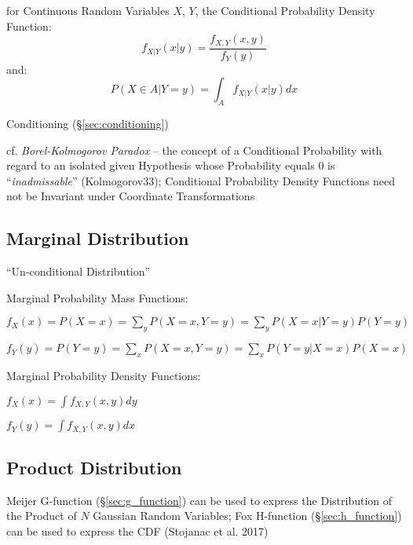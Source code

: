 for Continuous Random Variables $X$, $Y$, the Conditional Probability Density
Function:
\[
  f_{X|Y}(x|y) = \frac{f_{X,Y}(x,y)}{f_Y(y)}
\]
and:
\[
  P(X \in A| Y = y) = \int_A f_{X|Y}(x|y) dx
\]

\fist Conditioning (\S\ref{sec:conditioning})

cf. \emph{Borel-Kolmogorov Paradox} -- the concept of a Conditional Probability
with regard to an isolated given Hypothesis whose Probability equals $0$ is
``\emph{inadmissable}'' (Kolmogorov33); Conditional Probability Density
Functions need not be Invariant under Coordinate Transformations



\subsection{Marginal Distribution}\label{sec:marginal_distribution}

``Un-conditional Distribution''

Marginal Probability Mass Functions:

$f_X(x) = P(X = x) = \sum_y P(X = x, Y = y) = \sum_y P(X = x | Y = y) P(Y = y)$

$f_Y(y) = P(Y = y) = \sum_x P(X = x, Y = y) = \sum_x P(Y = y | X = x) P(X = x)$

Marginal Probability Density Functions:

$f_X(x) = \int f_{X,Y}(x,y) dy$

$f_Y(y) = \int f_{X,Y}(x,y) dx$



\subsection{Product Distribution}\label{sec:product_distribution}

\fist Meijer G-function (\S\ref{sec:g_function}) can be used to express the
Distribution of the Product of $N$ Gaussian Random Variables; Fox H-function
(\S\ref{sec:h_function}) can be used to express the CDF (Stojanac et al. 2017)



